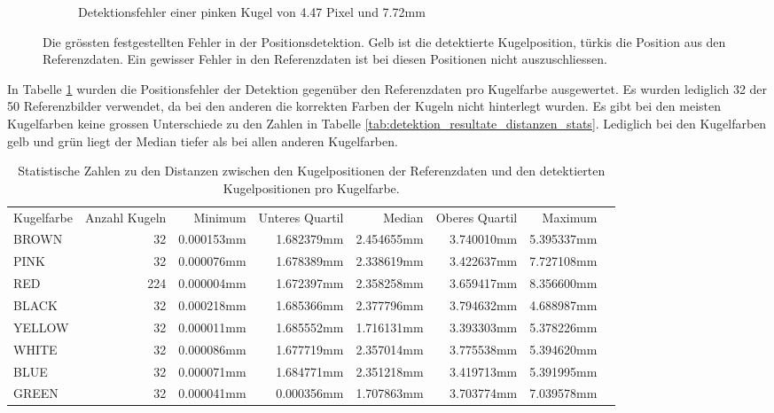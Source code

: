 \begin{figure}[h!]
\begin{subfigure}[t]{0.3\textwidth}
        \caption{Detektionsfehler einer pinken Kugel von 4.47 Pixel und 7.72mm}
        \label{fig:detection_results_bad_detection_2}
    \end{subfigure}
    \caption{
        Die grössten festgestellten Fehler in der Positionsdetektion. Gelb ist die detektierte Kugelposition, türkis die Position aus den Referenzdaten.
        Ein gewisser Fehler in den Referenzdaten ist bei diesen Positionen nicht auszuschliessen.
    }
    \label{fig:detection_results_bad_detections}
\end{figure}

In Tabelle \ref{tab:detektion_resultate_distanzen_stats_pro_kugelfarbe} wurden die Positionsfehler der Detektion
gegenüber den Referenzdaten pro Kugelfarbe ausgewertet.
Es wurden lediglich 32 der 50 Referenzbilder verwendet, da bei den anderen die korrekten Farben der Kugeln nicht hinterlegt wurden.
Es gibt bei den meisten Kugelfarben keine grossen Unterschiede zu den Zahlen in Tabelle \ref{tab:detektion_resultate_distanzen_stats}.
Lediglich bei den Kugelfarben gelb und grün liegt der Median tiefer als bei allen anderen Kugelfarben.

\begin{table}[ht]
    \begin{tabular}{ lrrrrrrr }
        \rowcolor{\seccolor!50}
        Kugelfarbe & Anzahl Kugeln & Minimum & Unteres Quartil & Median & Oberes Quartil & Maximum\\
        BROWN & 32 & 0.000153mm & 1.682379mm & 2.454655mm & 3.740010mm & 5.395337mm \\
        PINK & 32 & 0.000076mm & 1.678389mm & 2.338619mm & 3.422637mm & 7.727108mm \\
        RED & 224 & 0.000004mm & 1.672397mm & 2.358258mm & 3.659417mm & 8.356600mm \\
        BLACK & 32 & 0.000218mm & 1.685366mm & 2.377796mm & 3.794632mm & 4.688987mm \\
        YELLOW & 32 & 0.000011mm & 1.685552mm & 1.716131mm & 3.393303mm & 5.378226mm \\
        WHITE & 32 & 0.000086mm & 1.677719mm & 2.357014mm & 3.775538mm & 5.394620mm \\
        BLUE & 32 & 0.000071mm & 1.684771mm & 2.351218mm & 3.419713mm & 5.391995mm \\
        GREEN & 32 & 0.000041mm & 0.000356mm & 1.707863mm & 3.703774mm & 7.039578mm
    \end{tabular}
    \caption{Statistische Zahlen zu den Distanzen zwischen den Kugelpositionen der Referenzdaten und den detektierten Kugelpositionen pro Kugelfarbe.}
    \label{tab:detektion_resultate_distanzen_stats_pro_kugelfarbe}
\end{table}

